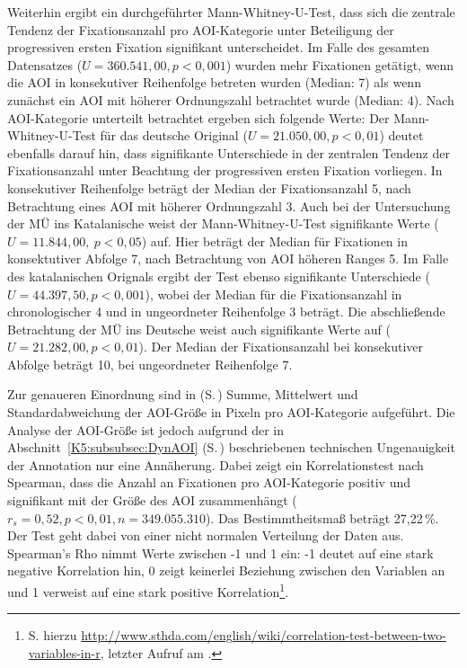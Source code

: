 
Weiterhin ergibt ein durchgeführter Mann-Whitney-U-Test, dass sich die zentrale Tendenz der Fixationsanzahl pro AOI-Kategorie unter Beteiligung der progressiven ersten Fixation signifikant unterscheidet. Im Falle des gesamten Datensatzes ($U = 360.541,00, p < 0,001$) wurden mehr Fixationen getätigt, wenn die AOI in konsekutiver Reihenfolge betreten wurden (Median: 7) als wenn zunächst ein AOI mit höherer Ordnungszahl betrachtet wurde (Median: 4). Nach AOI-Kategorie unterteilt betrachtet ergeben sich folgende Werte: Der Mann-Whitney-U-Test für das deutsche Original ($U = 21.050,00, p < 0,01$) deutet ebenfalls darauf hin, dass signifikante Unterschiede in der zentralen Tendenz der Fixationsanzahl unter Beachtung der progressiven ersten Fixation vorliegen. In konsekutiver Reihenfolge beträgt der Median der Fixationsanzahl 5, nach Betrachtung eines AOI mit höherer Ordnungszahl 3. Auch bei der Untersuchung der MÜ ins Katalanische weist der Mann-Whitney-U-Test signifikante Werte ($U = 11.844,00,\allowbreak\ p < 0,05$) auf. Hier beträgt der Median für Fixationen in konsektutiver Abfolge 7, nach Betrachtung von AOI höheren Ranges 5. Im Falle des katalanischen Orignals ergibt der Test ebenso signifikante Unterschiede ($U = 44.397,50, p < 0,001$), wobei der Median für die Fixationsanzahl in chronologischer 4 und in ungeordneter Reihenfolge 3 beträgt. Die abschließende Betrachtung der MÜ ins Deutsche weist auch signifikante Werte auf ($U = 21.282,00, p < 0,01$). Der Median der Fixationsanzahl bei konsekutiver Abfolge beträgt 10, bei ungeordneter Reihenfolge 7.

Zur genaueren Einordnung sind in  (S.\,\pageref{K6:tab:CatDe:mean-sd-iaarea}) Summe, Mittelwert und Standardabweichung der AOI-Größe in Pixeln pro AOI-Kategorie aufgeführt. Die Analyse der AOI-Größe ist jedoch aufgrund der in Abschnitt~\ref{K5:subsubsec:DynAOI} (S.\,\pageref{K5:subsubsec:DynAOI}) beschriebenen technischen Ungenauigkeit der Annotation nur eine Annäherung. Dabei zeigt ein Korrelationstest nach Spearman, dass die Anzahl an Fixationen pro AOI-Kategorie positiv und signifikant mit der Größe des AOI zusammenhängt ($r_{s} = 0,52, p < 0,01, n = 349.055.310$). Das Bestimmtheitsmaß beträgt 27,22\,\%. Der Test geht dabei von einer nicht normalen Verteilung der Daten aus. Spearman's Rho nimmt Werte zwischen -1 und 1 ein: -1 deutet auf eine stark negative Korrelation hin, 0 zeigt keinerlei Beziehung zwischen den Variablen an und 1 verweist auf eine stark positive Korrelation\footnote{S. hierzu \href{http://www.sthda.com/english/wiki/correlation-test-between-two-variables-in-r}{http://www.sthda.com/english/wiki/correlation-test-between-two-variables-in-r}, letzter Aufruf am \datum{}.}.



